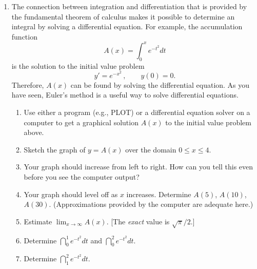 \begin{enumerate}
  \begin{enumerate}
  \item Show that $F$ and $G$ both satisfy the initial value problem
	\[
y' = \dfrac{x}{\sqrt{1+x^2}},  \qquad y(0) = 0.
\]


  \item Since an initial value problem typically has a {\em unique\/}
solution, $F$ and $G$ should be equal.  Assuming this, determine the
exact value of the following definite integrals.
	\[
\int_0^1 \dfrac{t}{\sqrt{1+t^2}} \, dt, \qquad
		\int_0^2 \dfrac{t}{\sqrt{1+t^2}} \, dt, \qquad 
		\int_0^5 \dfrac{t}{\sqrt{1+t^2}} \, dt.
\]


\end{enumerate}
\item The connection between integration and differentiation that is
provided by the fundamental theorem of calculus makes it possible to
determine an integral by solving a differential equation.  For
example, the accumulation function
	\[
A(x) = \int_0^x e^{-t^2} dt
\]
is the solution to the initial value problem
	\[
y' = e^{-x^2} \, , \qquad y(0) = 0.
\]
Therefore, $A(x)$ can be found by solving the differential equation.
As you have seen, Euler's method is a useful way to solve differential
equations.

  \begin{enumerate}
  \item Use either a program (e.g., PLOT) or a differential equation
solver on a computer to get a graphical solution $A(x)$ to the initial
value problem above.

  \item Sketch the graph of $y = A(x)$ over the domain $0 \leq x \leq 4$.

  \item Your graph should increase from left to right.  How can you tell
this even before you see the computer output?

  \item Your graph should level off as $x$ increases.  Determine $A(5)$,
$A(10)$, $A(30)$.  (Approximations provided by the computer are
adequate here.)


  \item Estimate ${\displaystyle \lim_{x \to \infty} A(x)}$.  \hfill [The
  {\em exact\/} value is $\sqrt{\pi}/2$.]


  \item Determine $\dint_0^1 e^{-t^2} dt$ and $\dint_0^2 e^{-t^2} dt$.

  \item Determine $\dint_1^2 e^{-t^2} dt$.



\end{enumerate}
\end{enumerate}
